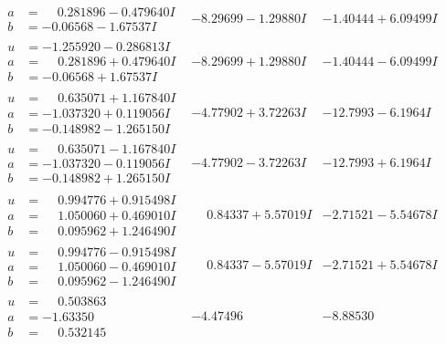 \documentclass[1p]{elsarticle_modified}
\theoremstyle{definition}
\begin{document}
$$\begin{array}{c|c|c}
\begin{aligned}
a &= \phantom{-}0.281896 - 0.479640 I \\
b &= -0.06568 - 1.67537 I\end{aligned}
 & -8.29699 - 1.29880 I & -1.40444 + 6.09499 I \\ \hline\begin{aligned}
u &= -1.255920 - 0.286813 I \\
a &= \phantom{-}0.281896 + 0.479640 I \\
b &= -0.06568 + 1.67537 I\end{aligned}
 & -8.29699 + 1.29880 I & -1.40444 - 6.09499 I \\ \hline\begin{aligned}
u &= \phantom{-}0.635071 + 1.167840 I \\
a &= -1.037320 + 0.119056 I \\
b &= -0.148982 - 1.265150 I\end{aligned}
 & -4.77902 + 3.72263 I & -12.7993 - 6.1964 I \\ \hline\begin{aligned}
u &= \phantom{-}0.635071 - 1.167840 I \\
a &= -1.037320 - 0.119056 I \\
b &= -0.148982 + 1.265150 I\end{aligned}
 & -4.77902 - 3.72263 I & -12.7993 + 6.1964 I \\ \hline\begin{aligned}
u &= \phantom{-}0.994776 + 0.915498 I \\
a &= \phantom{-}1.050060 + 0.469010 I \\
b &= \phantom{-}0.095962 + 1.246490 I\end{aligned}
 & \phantom{-}0.84337 + 5.57019 I & -2.71521 - 5.54678 I \\ \hline\begin{aligned}
u &= \phantom{-}0.994776 - 0.915498 I \\
a &= \phantom{-}1.050060 - 0.469010 I \\
b &= \phantom{-}0.095962 - 1.246490 I\end{aligned}
 & \phantom{-}0.84337 - 5.57019 I & -2.71521 + 5.54678 I \\ \hline\begin{aligned}
u &= \phantom{-}0.503863\phantom{ +0.000000I} \\
a &= -1.63350\phantom{ +0.000000I} \\
b &= \phantom{-}0.532145\phantom{ +0.000000I}\end{aligned}
 & -4.47496\phantom{ +0.000000I} & -8.88530\phantom{ +0.000000I} \\ \hline\begin{aligned}

\end{aligned}
\end{array}$$
\end{document}
